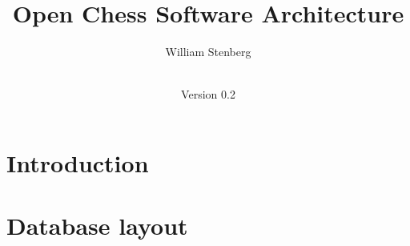 \documentclass[a4paper,11pt,x11 names]{article}
\title{Open Chess Software Architecture}
\date{\documentdate\\Version 0.2}
\author{William Stenberg}
\begin{document}
\maketitle
\section*{Introduction}

\section*{Database layout}

\end{document}

